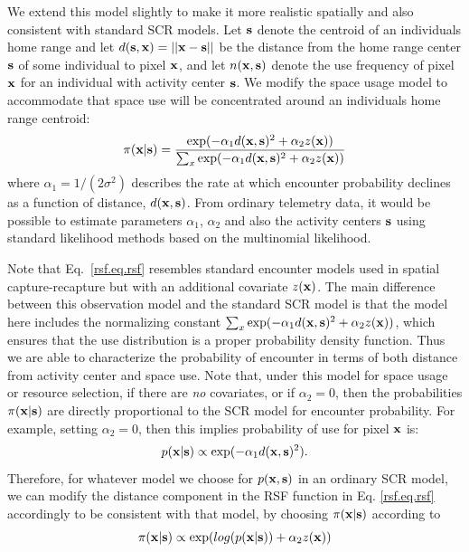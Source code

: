 \documentclass[12pt]{article}
\begin{document}
We extend this model slightly to make it more realistic spatially and
also consistent with standard SCR models. Let
${\bf s}$ denote the centroid of an individuals home range and let
$d({\bf s},{\bf x}) = ||{\bf x} - {\bf s}||$ be the distance from the home
range center ${\bf s}$ of some individual to pixel ${\bf x}$, and let
$n({\bf x},{\bf s})$ denote the use frequency of pixel ${\bf x}$ for an individual with
activity center ${\bf s}$.
We modify the space usage model to accommodate that space
use will be concentrated around an individuals home range centroid:
\begin{equation}
 \pi({\bf x}|{\bf s})  = \frac{ \exp( -\alpha_{1} d({\bf x},{\bf s})^{2} +\alpha_{2} z({\bf x}) )}
{ \sum_{x} \exp(-\alpha_{1} d({\bf x},{\bf s})^{2} +\alpha_{2} z({\bf x}))}
\label{rsf.eq.rsf}
\end{equation}
where $\alpha_1=1/(2\sigma^2)$ describes the rate at which encounter
probability declines as a function of distance, $d({\bf x},{\bf
  s})$. From ordinary telemetry data, it would be possible to estimate
parameters $\alpha_{1}$, $\alpha_{2}$ and also the activity centers
${\bf s}$ using standard likelihood methods based on the multinomial likelihood.

Note that Eq.~\ref{rsf.eq.rsf} resembles standard encounter models
used in spatial capture-recapture but with an additional covariate
$z({\bf x})$.  The main difference between this observation model and
the standard SCR model is that the model here includes the normalizing
constant $\sum_{x} \exp(-\alpha_{1} d({\bf x},{\bf s})^{2} +\alpha_{2}
z({\bf x}))$, which ensures that the use distribution is a proper
probability density function. Thus we are able to characterize the
probability of encounter in terms of both distance from activity
center and space use.
Note that, under this model for space usage or resource selection, if
there are {\it no} covariates, or if $\alpha_{2} = 0$, then the
probabilities $\pi({\bf x}|{\bf s})$ are directly proportional to the
SCR model for encounter probability.  For example, setting $\alpha_{2}
= 0$, then this implies probability of use for pixel ${\bf x}$ is:
\[
p({\bf x}|{\bf s}) \propto  \exp( -\alpha_{1} d({\bf x},{\bf s})^{2}).
\]
Therefore,
for whatever model we choose for
$p({\bf x},{\bf s})$ in an ordinary SCR model, we can modify the distance
component in the RSF function in Eq. \ref{rsf.eq.rsf} accordingly to
be consistent with that model, by choosing $\pi({\bf x}|{\bf s})$
according to
\[
\pi({\bf x}|{\bf s}) \propto \exp( log(p({\bf x}|{\bf s})) + \alpha_{2} z({\bf x}))
\]
\end{document}

